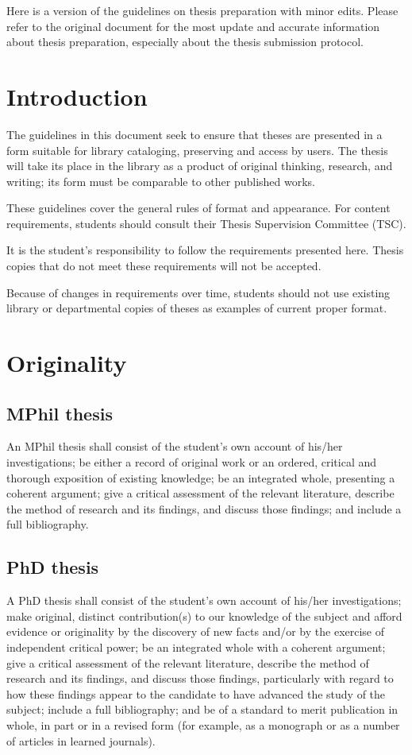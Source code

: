Here is a version of the guidelines on thesis preparation with minor edits. Please refer to the original document \citep{guidelines} for the most update and accurate information about thesis preparation, especially about the thesis submission protocol. 
\section{Introduction}
The guidelines in this document seek to ensure that theses are presented in a form suitable for library cataloging, preserving and access by users. The thesis will take its place in the library as a product of original thinking, research, and writing; its form must be comparable to other published works.

These guidelines cover the general rules of format and appearance. For content requirements, students should consult their Thesis Supervision Committee (TSC).

It is the student's responsibility to follow the requirements presented here. Thesis copies that do not meet these requirements will not be accepted.

Because of changes in requirements over time, students should not use existing library or departmental copies of theses as examples of current proper format.

\section{Originality}
\subsection{MPhil thesis}
An MPhil thesis shall consist of the student's own account of his/her investigations; be either a record of original work or an ordered, critical and thorough exposition of existing knowledge; be an integrated whole, presenting a coherent argument; give a critical assessment of the relevant literature, describe the method of research and its findings, and discuss those findings; and include a full bibliography.
\subsection{PhD thesis}
A PhD thesis shall consist of the student's own account of his/her investigations; make original, distinct contribution(s) to our knowledge of the subject and afford evidence or originality by the discovery of new facts and/or by the exercise of independent critical power; be an integrated whole with a coherent argument; give a critical assessment of the relevant literature, describe the method of research and its findings, and discuss those findings, particularly with regard to how these findings appear to the candidate to have advanced the study of the subject; include a full bibliography; and be of a standard to merit publication in whole, in part or in a revised form (for example, as a monograph or as a number of articles in learned journals).

